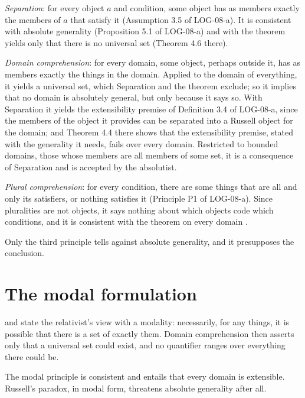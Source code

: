 \documentclass{situationist-preprint}
\begin{document}
\emph{Separation}: for every object $a$ and condition, some object has as members exactly the members of $a$ that satisfy it (Assumption 3.5 of LOG-08-a). It is consistent with absolute generality (Proposition 5.1 of LOG-08-a) and with the theorem yields only that there is no universal set (Theorem 4.6 there).

\emph{Domain comprehension}: for every domain, some object, perhaps outside it, has as members exactly the things in the domain. Applied to the domain of everything, it yields a universal set, which Separation and the theorem exclude; so it implies that no domain is absolutely general, but only because it says so. With Separation it yields the extensibility premise of Definition 3.4 of LOG-08-a, since the members of the object it provides can be separated into a Russell object for the domain; and Theorem 4.4 there shows that the extensibility premise, stated with the generality it needs, fails over every domain. Restricted to bounded domains, those whose members are all members of some set, it is a consequence of Separation and is accepted by the absolutist.

\emph{Plural comprehension}: for every condition, there are some things that are all and only its satisfiers, or nothing satisfies it (Principle P1 of LOG-08-a). Since pluralities are not objects, it says nothing about which objects code which conditions, and it is consistent with the theorem on every domain \citep{Boolos1984}.

Only the third principle tells against absolute generality, and it presupposes the conclusion.

\section{The modal formulation}

\citet{Linnebo2013} and \citet{Studd2019} state the relativist's view with a modality: necessarily, for any things, it is possible that there is a set of exactly them. Domain comprehension then asserts only that a universal set could exist, and no quantifier ranges over everything there could be.

\begin{objection}
The modal principle is consistent and entails that every domain is extensible. Russell's paradox, in modal form, threatens absolute generality after all.
\end{objection}
\end{document}
